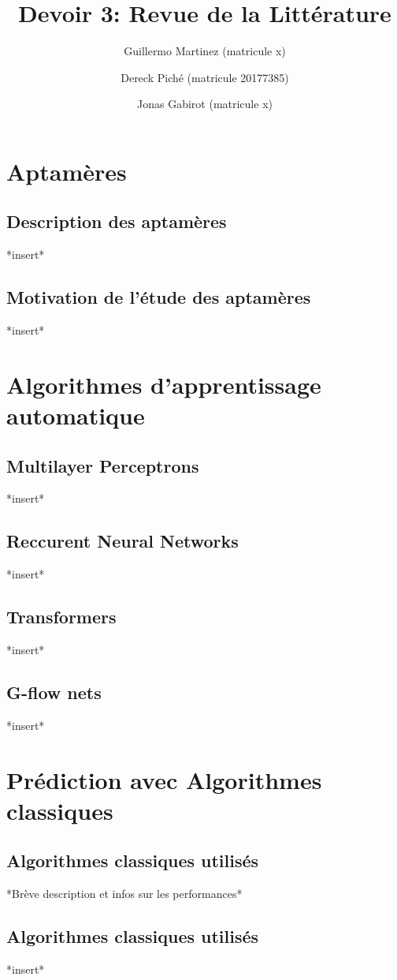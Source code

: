 \documentclass{article}
\title{Devoir 3: Revue de la Littérature}
\author
{
    Guillermo Martinez (matricule x)
    \and
    Dereck Piché (matricule 20177385)
    \and
    Jonas Gabirot (matricule x)
}
\begin{document}
\maketitle

\section*{Aptamères}
\subsection*{Description des aptamères}
*insert*
\subsection*{Motivation de l'étude des aptamères}
*insert*

\section*{Algorithmes d'apprentissage automatique}
\subsection*{Multilayer Perceptrons}
*insert*
\subsection*{Reccurent Neural Networks}
*insert*
\subsection*{Transformers}
*insert*
\subsection*{G-flow nets}
*insert*

\section*{Prédiction avec Algorithmes classiques}
\subsection*{Algorithmes classiques utilisés}
*Brève description et infos sur les performances*
\subsection*{Algorithmes classiques utilisés}
*insert*
\end{document}
